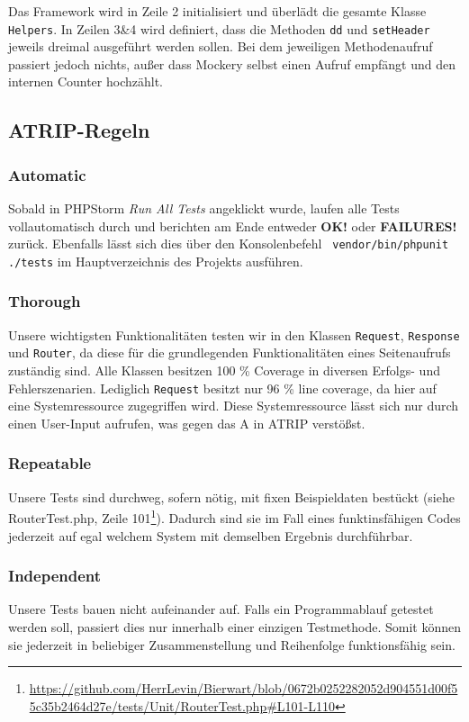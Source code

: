 \documentclass[12pt,a4paper,titlepage,ngerman,pdftex]{report}
\begin{document}
    Das Framework wird in Zeile 2 initialisiert und überlädt die gesamte Klasse \verb|Helpers|.
    In Zeilen 3\&4 wird definiert, dass die Methoden \verb|dd| und \verb|setHeader| jeweils dreimal ausgeführt werden sollen.
    Bei dem jeweiligen Methodenaufruf passiert jedoch nichts, außer dass Mockery selbst einen Aufruf empfängt und den internen Counter hochzählt.

    \subsection{ATRIP-Regeln}
    \label{subsec:atrip-regeln}

    \subsubsection{Automatic}
    Sobald in PHPStorm \textit{Run All Tests} angeklickt wurde, laufen alle Tests vollautomatisch durch und berichten am Ende entweder \textbf{OK!} oder \textbf{FAILURES!} zurück.
    Ebenfalls lässt sich dies über den Konsolenbefehl \verb| vendor/bin/phpunit ./tests| im Hauptverzeichnis des Projekts ausführen.

    \subsubsection{Thorough}
    Unsere wichtigsten Funktionalitäten testen wir in den Klassen \verb|Request|, \verb|Response| und \verb|Router|, da diese für die grundlegenden Funktionalitäten eines Seitenaufrufs zuständig sind.
    Alle Klassen besitzen 100 \% Coverage in diversen Erfolgs- und Fehlerszenarien. Lediglich \verb|Request| besitzt nur 96 \% line coverage, da hier auf eine Systemressource zugegriffen wird.
    Diese Systemressource lässt sich nur durch einen User-Input aufrufen, was gegen das A in ATRIP verstößst.

    \subsubsection{Repeatable}
    Unsere Tests sind durchweg, sofern nötig, mit fixen Beispieldaten bestückt (siehe RouterTest.php, Zeile 101\footnote{\url{https://github.com/HerrLevin/Bierwart/blob/0672b0252282052d904551d00f55c35b2464d27e/tests/Unit/RouterTest.php#L101-L110}}).
    Dadurch sind sie im Fall eines funktinsfähigen Codes jederzeit auf egal welchem System mit demselben Ergebnis durchführbar.

    \subsubsection{Independent}
    Unsere Tests bauen nicht aufeinander auf.
    Falls ein Programmablauf getestet werden soll, passiert dies nur innerhalb einer einzigen Testmethode.
    Somit können sie jederzeit in beliebiger Zusammenstellung und Reihenfolge funktionsfähig sein.
\end{document}

